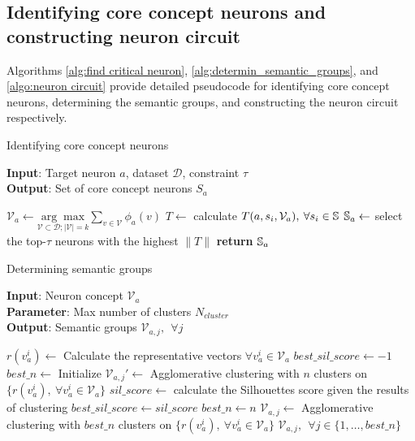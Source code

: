 \subsection{Identifying core concept neurons and constructing neuron circuit}
Algorithms \ref{alg:find critical neuron}, \ref{alg:determin_semantic_groups}, and \ref{algo:neuron circuit} provide detailed pseudocode for identifying core concept neurons, determining the semantic groups, and constructing the neuron circuit respectively.
\begin{algorithm}[tbh]
    \caption{Identifying core concept neurons}
    \textbf{Input}: Target neuron $a$, dataset $\mathcal{D}$, constraint $\tau$ \\
    \textbf{Output}: Set of core concept neurons $S_a$
    \begin{algorithmic}[0]
        \STATE $\mathcal{V}_a \leftarrow \underset{\mathcal{V} \subset \mathcal{D}; |\mathcal{V}| = k}{\arg \max} \sum_{v \in \mathcal{V}} \phi_{a}(v)$
        \STATE $T \leftarrow$ calculate $T(a,s_i, \mathcal{V}_a), \: \forall s_i \in {\mathbb{S}}$
        \STATE ${\mathbb{S}}_a \leftarrow$ select the top-$\tau$ neurons with the highest $\|T\|$
        \STATE \textbf{return} ${\mathbb{S}}_a$
    \end{algorithmic}\label{alg:find critical neuron}
\end{algorithm}
\begin{algorithm}[H]
    \caption{Determining semantic groups}
    \textbf{Input}: Neuron concept $\mathcal{V}_a$ \\
    \textbf{Parameter}: Max number of clusters $N_{cluster}$ \\
    \textbf{Output}: Semantic groups $\mathcal{V}_{a, j}, \: \: \forall j$
    \begin{algorithmic}[0]
        \STATE $r(v^i_a) \leftarrow$ Calculate the representative vectors $\forall v^i_a \in \mathcal{V}_a$
        \STATE $best\_sil\_score \leftarrow -1$ 
        \STATE $best\_n \leftarrow$ Initialize 
            \STATE $\mathcal{V}_{a, j}' \leftarrow$ Agglomerative clustering with $n$ clusters on $\{r(v^i_a), \: \forall v^i_a \in \mathcal{V}_a\}$
            \STATE $sil\_score \leftarrow$ calculate the Silhouettes score given the results of clustering
                \STATE $best\_sil\_score \leftarrow sil\_score$
                \STATE $best\_n \leftarrow n$
            \ENDIF
        \ENDFOR
        \STATE $\mathcal{V}_{a, j} \leftarrow$ Agglomerative clustering with $best\_n$ clusters on $\{r(v^i_a), \: \forall v^i_a \in \mathcal{V}_a\}$
        \RETURN $\mathcal{V}_{a, j}, \: \: \forall j \in \{ 1, \dots, best\_n \}$
    \end{algorithmic}\label{alg:determin_semantic_groups}
\end{algorithm}
